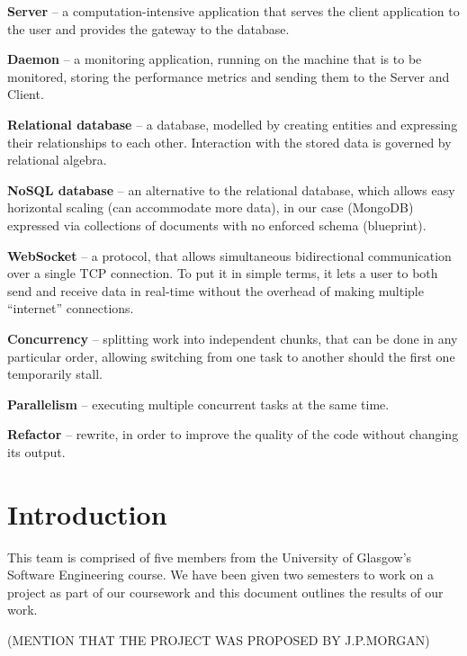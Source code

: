 \documentclass{l3proj}
\begin{document}
\textbf{Server} – a computation-intensive application that serves the client application to the user and provides the gateway to the database.

\textbf{Daemon} – a monitoring application, running on the machine that is to be monitored, storing the performance metrics and sending them to the Server and Client.

\textbf{Relational database} – a database, modelled by creating entities and expressing their relationships to each other. Interaction with the stored data is governed by relational algebra.

\textbf{NoSQL database} – an alternative to the relational database, which allows easy horizontal scaling (can accommodate more data), in our case (MongoDB) expressed via collections of documents with no enforced schema (blueprint).

\textbf{WebSocket} – a protocol, that allows simultaneous bidirectional communication over a single TCP connection. To put it in simple terms, it lets a user to both send and receive data in real-time without the overhead of making multiple ``internet'' connections.

\textbf{Concurrency} – splitting work into independent chunks, that can be done in any particular order, allowing switching from one task to another should the first one temporarily stall.

\textbf{Parallelism} – executing multiple concurrent tasks at the same time. 

\textbf{Refactor} – rewrite, in order to improve the quality of the code without changing its output.



\chapter{Introduction}
\label{intro}

This team is comprised of five members from the University of Glasgow's Software Engineering course. We have been given two semesters to work on a project as part of our coursework and this document outlines the results of our work.

(MENTION THAT THE PROJECT WAS PROPOSED BY J.P.MORGAN)
\end{document}
